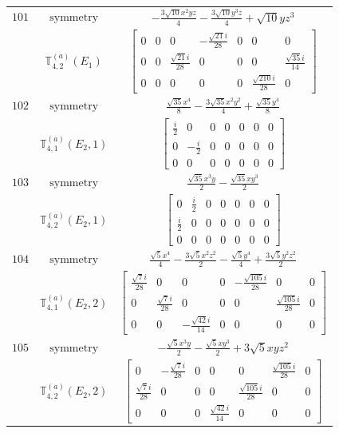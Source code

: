 \documentclass[fleqn,8pt,landscape]{jsarticle}
\begin{document}
\begin{longtable}{ccc}
$ 101 $ & $ \text{symmetry} $ & $ - \frac{3 \sqrt{10} x^{2} y z}{4} - \frac{3 \sqrt{10} y^{3} z}{4} + \sqrt{10} y z^{3} $ \\
$  $ & $ \mathbb{T}_{4,2}^{(a)}(E_{1}) $ & $ \begin{bmatrix} 0 & 0 & 0 & - \frac{\sqrt{21} i}{28} & 0 & 0 & 0 \\ 0 & 0 & \frac{\sqrt{21} i}{28} & 0 & 0 & 0 & \frac{\sqrt{35} i}{14} \\ 0 & 0 & 0 & 0 & 0 & \frac{\sqrt{210} i}{28} & 0 \end{bmatrix} $ \\ \hline
$ 102 $ & $ \text{symmetry} $ & $ \frac{\sqrt{35} x^{4}}{8} - \frac{3 \sqrt{35} x^{2} y^{2}}{4} + \frac{\sqrt{35} y^{4}}{8} $ \\
$  $ & $ \mathbb{T}_{4,1}^{(a)}(E_{2},1) $ & $ \begin{bmatrix} \frac{i}{2} & 0 & 0 & 0 & 0 & 0 & 0 \\ 0 & - \frac{i}{2} & 0 & 0 & 0 & 0 & 0 \\ 0 & 0 & 0 & 0 & 0 & 0 & 0 \end{bmatrix} $ \\ \hline
$ 103 $ & $ \text{symmetry} $ & $ \frac{\sqrt{35} x^{3} y}{2} - \frac{\sqrt{35} x y^{3}}{2} $ \\
$  $ & $ \mathbb{T}_{4,2}^{(a)}(E_{2},1) $ & $ \begin{bmatrix} 0 & \frac{i}{2} & 0 & 0 & 0 & 0 & 0 \\ \frac{i}{2} & 0 & 0 & 0 & 0 & 0 & 0 \\ 0 & 0 & 0 & 0 & 0 & 0 & 0 \end{bmatrix} $ \\ \hline
$ 104 $ & $ \text{symmetry} $ & $ \frac{\sqrt{5} x^{4}}{4} - \frac{3 \sqrt{5} x^{2} z^{2}}{2} - \frac{\sqrt{5} y^{4}}{4} + \frac{3 \sqrt{5} y^{2} z^{2}}{2} $ \\
$  $ & $ \mathbb{T}_{4,1}^{(a)}(E_{2},2) $ & $ \begin{bmatrix} \frac{\sqrt{7} i}{28} & 0 & 0 & 0 & - \frac{\sqrt{105} i}{28} & 0 & 0 \\ 0 & \frac{\sqrt{7} i}{28} & 0 & 0 & 0 & \frac{\sqrt{105} i}{28} & 0 \\ 0 & 0 & - \frac{\sqrt{42} i}{14} & 0 & 0 & 0 & 0 \end{bmatrix} $ \\ \hline
$ 105 $ & $ \text{symmetry} $ & $ - \frac{\sqrt{5} x^{3} y}{2} - \frac{\sqrt{5} x y^{3}}{2} + 3 \sqrt{5} x y z^{2} $ \\
$  $ & $ \mathbb{T}_{4,2}^{(a)}(E_{2},2) $ & $ \begin{bmatrix} 0 & - \frac{\sqrt{7} i}{28} & 0 & 0 & 0 & \frac{\sqrt{105} i}{28} & 0 \\ \frac{\sqrt{7} i}{28} & 0 & 0 & 0 & \frac{\sqrt{105} i}{28} & 0 & 0 \\ 0 & 0 & 0 & \frac{\sqrt{42} i}{14} & 0 & 0 & 0 \end{bmatrix} $ \\ \hline

\end{longtable}
\end{document}
